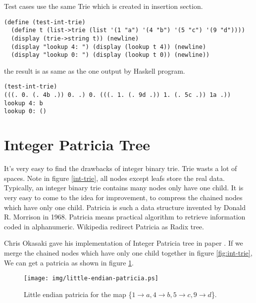 \documentclass{article}
\begin{document}
Test cases use the same Trie which is created in insertion section.

\begin{lstlisting}
(define (test-int-trie)
  (define t (list->trie (list '(1 "a") '(4 "b") '(5 "c") '(9 "d"))))
  (display (trie->string t)) (newline)
  (display "lookup 4: ") (display (lookup t 4)) (newline)
  (display "lookup 0: ") (display (lookup t 0)) (newline))
\end{lstlisting}

the result is as same as the one output by Haskell program.

\begin{lstlisting}
(test-int-trie)
(((. 0. (. 4b .)) 0. .) 0. (((. 1. (. 9d .)) 1. (. 5c .)) 1a .))
lookup 4: b
lookup 0: ()
\end{lstlisting}

\section{Integer Patricia Tree} 
\label{int-patricia}

It's very easy to find the drawbacks of integer binary trie. Trie wasts a lot of 
spaces. Note in figure \ref{int-trie}, all nodes except leafs store the real data.
Typically, an integer binary trie contains many nodes only have one child.
It is very easy to come to the idea for improvement, to compress the chained nodes
which have only one child. Patricia is such a data structure invented by 
Donald R. Morrison in 1968. Patricia means practical algorithm to retrieve information coded
in alphanumeric\cite{patricia-morrison}. Wikipedia redirect Patricia as Radix tree.

Chris Okasaki gave his implementation of Integer Patricia tree in paper \cite{okasaki-int-map}. 
If we merge the chained nodes which have only one child together in figure \ref{fig:int-trie},
We can get a patricia as shown in figure \ref{fig:little-endian-patricia}.

\begin{figure}[htbp]
       \begin{center}
	\texttt{[image: img/little-endian-patricia.ps]}
        \caption{Little endian patricia for the map 
                        \{$ 1 \rightarrow a, 4 \rightarrow b, 5 \rightarrow c, 9 \rightarrow d$\}.} 
        \label{fig:little-endian-patricia}
       \end{center}
\end{figure}
\end{document}

